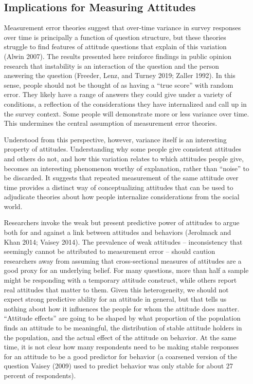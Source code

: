 \documentclass[12pt,]{article}
\begin{document}
\hypertarget{implications-for-measuring-attitudes}{%
\subsection{Implications for Measuring Attitudes}\label{implications-for-measuring-attitudes}}

Measurement error theories suggest that over-time variance in survey responses over time is principally a function of question structure, but these theories struggle to find features of attitude questions that explain of this variation (Alwin 2007). The results presented here reinforce findings in public opinion research that instability is an interaction of the question and the person answering the question (Freeder, Lenz, and Turney 2019; Zaller 1992). In this sense, people should not be thought of as having a ``true score'' with random error. They likely have a range of answers they could give under a variety of conditions, a reflection of the considerations they have internalized and call up in the survey context. Some people will demonstrate more or less variance over time. This undermines the central assumption of measurement error theories.

Understood from this perspective, however, variance itself is an interesting property of attitudes. Understanding why some people give consistent attitudes and others do not, and how this variation relates to which attitudes people give, becomes an interesting phenomenon worthy of explanation, rather than ``noise'' to be discarded. It suggests that repeated measurement of the same attitude over time provides a distinct way of conceptualizing attitudes that can be used to adjudicate theories about how people internalize considerations from the social world.

Researchers invoke the weak but present predictive power of attitudes to argue both for and against a link between attitudes and behaviors (Jerolmack and Khan 2014; Vaisey 2014). The prevalence of weak attitudes -- inconsistency that seemingly cannot be attributed to measurement error -- should caution researchers away from assuming that cross-sectional measures of attitudes are a good proxy for an underlying belief. For many questions, more than half a sample might be responding with a temporary attitude construct, while others report real attitudes that matter to them. Given this heterogeneity, we should not expect strong predictive ability for an attitude in general, but that tells us nothing about how it influences the people for whom the attitude does matter. ``Attitude effects'' are going to be shaped by what proportion of the population finds an attitude to be meaningful, the distribution of stable attitude holders in the population, and the actual effect of the attitude on behavior. At the same time, it is not clear how many respondents need to be making stable responses for an attitude to be a good predictor for behavior (a coarsened version of the question Vaisey (2009) used to predict behavior was only stable for about 27 percent of respondents).
\end{document}
